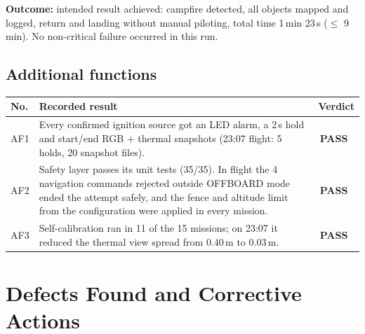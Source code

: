 \documentclass[10pt,a4paper]{article}
\newcommand{\PASS}{\textcolor{passgreen}{\textbf{\ding{51}\,PASS}}}
\newcommand{\head}[1]{\textbf{#1}}
\begin{document}
\textbf{Outcome:} intended result achieved: campfire detected, all objects mapped and logged, return and landing without
manual piloting, total time 1\,min 23\,s ($\le$ 9\,min). No non-critical failure occurred in this run.

\subsection{Additional functions}
\begin{tabularx}{\textwidth}{|L{0.8cm}|Y|L{1.9cm}|}
\hline
{}\head{No.} & \head{Recorded result} & \head{Verdict} \\ \hline
AF1 & Every confirmed ignition source got an LED alarm, a 2\,s hold and start/end RGB + thermal snapshots (23:07 flight: 5 holds, 20 snapshot files). & \PASS \\ \hline
AF2 & Safety layer passes its unit tests (35/35). In flight the 4 navigation commands rejected outside OFFBOARD mode ended the attempt safely, and the fence and altitude limit from the configuration were applied in every mission. & \PASS \\ \hline
AF3 & Self-calibration ran in 11 of the 15 missions; on 23:07 it reduced the thermal view spread from 0.40\,m to 0.03\,m. & \PASS \\ \hline
\end{tabularx}

\section{Defects Found and Corrective Actions}
\end{document}
